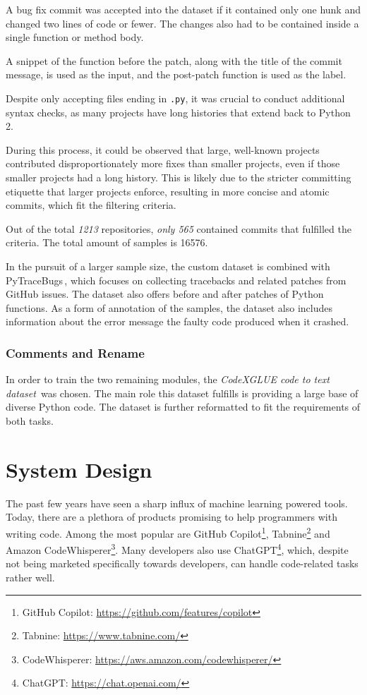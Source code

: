         A bug fix commit was accepted into the dataset if it contained only one hunk and changed two lines of code or fewer. The changes also had to be contained inside a single function or method body. 
        
        A snippet of the function before the patch, along with the title of the commit message, is used as the input, and the post-patch function is used as the label.
        
        Despite only accepting files ending in \texttt{.py}, it was crucial to conduct additional syntax checks, as many projects have long histories that extend back to Python 2.
        
        \medskip
        
        During this process, it could be observed that large, well-known projects contributed disproportionately more fixes than smaller projects, even if those smaller projects had a long history. This is likely due to the stricter committing etiquette that larger projects enforce, resulting in more concise and atomic commits, which fit the filtering criteria.
        
        Out of the total \emph{1213} repositories, \emph{only 565} contained commits that fulfilled the criteria. The total amount of samples is 16576.
        
        \medskip 
        
        In the pursuit of a larger sample size, the custom dataset is combined with PyTraceBugs\,\cite{pytracebugs}, which focuses on collecting tracebacks and related patches from GitHub issues. The dataset also offers before and after patches of Python functions. As a form of annotation of the samples, the dataset also includes information about the error message the faulty code produced when it crashed.
        
    \subsection{Comments and Rename}

        In order to train the two remaining modules, the \emph{CodeXGLUE code to text dataset}\,\cite{codexglue} was chosen. The main role this dataset fulfills is providing a large base of diverse Python code. The dataset is further reformatted to fit the requirements of both tasks.
    
\chapter{System Design}
    The past few years have seen a sharp influx of machine learning powered tools. Today, there are a plethora of products promising to help programmers with writing code. Among the most popular are GitHub Copilot\footnote{GitHub Copilot: \url{https://github.com/features/copilot}}, Tabnine\footnote{Tabnine: \url{https://www.tabnine.com/}} and Amazon CodeWhisperer\footnote{CodeWhisperer: \url{https://aws.amazon.com/codewhisperer/}}. Many developers also use ChatGPT\footnote{ChatGPT: \url{https://chat.openai.com/}}, which, despite not being marketed specifically towards developers, can handle code-related tasks rather well.
    
